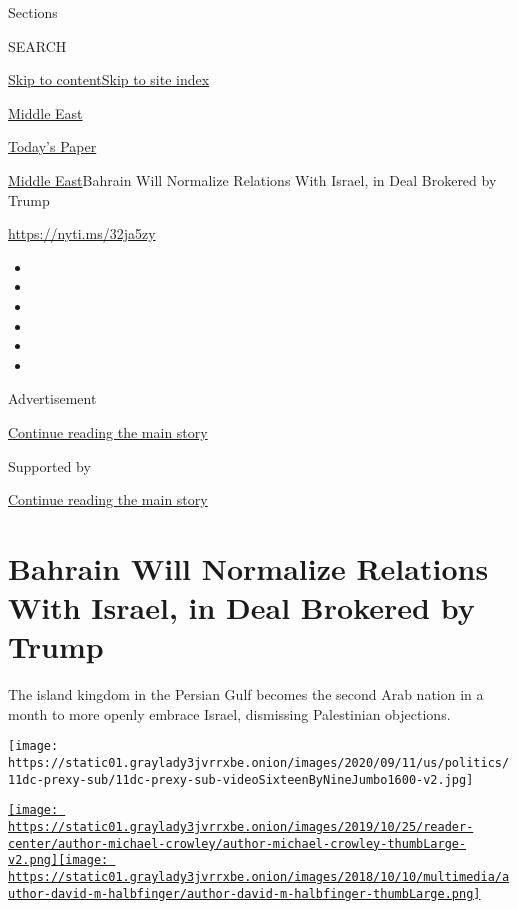 Sections

SEARCH

\protect\hyperlink{site-content}{Skip to
content}\protect\hyperlink{site-index}{Skip to site index}

\href{https://www.nytimes3xbfgragh.onion/section/world/middleeast}{Middle
East}

\href{https://myaccount.nytimes3xbfgragh.onion/auth/login?response_type=cookie\&client_id=vi}{}

\href{https://www.nytimes3xbfgragh.onion/section/todayspaper}{Today's
Paper}

\href{/section/world/middleeast}{Middle East}\textbar{}Bahrain Will
Normalize Relations With Israel, in Deal Brokered by Trump

\url{https://nyti.ms/32ja5zy}

\begin{itemize}
\item
\item
\item
\item
\item
\item
\end{itemize}

Advertisement

\protect\hyperlink{after-top}{Continue reading the main story}

Supported by

\protect\hyperlink{after-sponsor}{Continue reading the main story}

\hypertarget{bahrain-will-normalize-relations-with-israel-in-deal-brokered-by-trump}{%
\section{Bahrain Will Normalize Relations With Israel, in Deal Brokered
by
Trump}\label{bahrain-will-normalize-relations-with-israel-in-deal-brokered-by-trump}}

The island kingdom in the Persian Gulf becomes the second Arab nation in
a month to more openly embrace Israel, dismissing Palestinian
objections.

\texttt{[image: https://static01.graylady3jvrrxbe.onion/images/2020/09/11/us/politics/11dc-prexy-sub/11dc-prexy-sub-videoSixteenByNineJumbo1600-v2.jpg]}

\href{https://www.nytimes3xbfgragh.onion/by/michael-crowley}{\texttt{[image: https://static01.graylady3jvrrxbe.onion/images/2019/10/25/reader-center/author-michael-crowley/author-michael-crowley-thumbLarge-v2.png]}}\href{https://www.nytimes3xbfgragh.onion/by/david-m-halbfinger}{\texttt{[image: https://static01.graylady3jvrrxbe.onion/images/2018/10/10/multimedia/author-david-m-halbfinger/author-david-m-halbfinger-thumbLarge.png]}}

